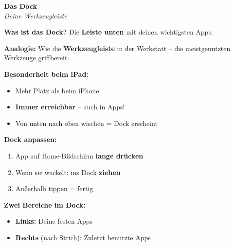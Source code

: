 \documentclass[a4paper,landscape,8pt]{extarticle}
\begin{document}
\hfill%
\begin{minipage}[t]{0.32\linewidth}
\begin{center}
\colorbox{splitblue!10}{%
\begin{minipage}{0.95\linewidth}
\vspace{2mm}
\begin{center}
{\Large\bfseries\textcolor{splitblue}{Das Dock}}\\[1pt]
{\footnotesize\itshape Deine Werkzeugleiste}
\end{center}
\vspace{2mm}
\end{minipage}%
}
\end{center}

\vspace{1mm}

\textbf{Was ist das Dock?} Die \textbf{Leiste unten} mit deinen wichtigsten Apps.

\textbf{Analogie:} Wie die \textbf{Werkzeugleiste} in der Werkstatt -- die meistgenutzten Werkzeuge griffbereit.

\textbf{Besonderheit beim iPad:}
\begin{itemize}
\item Mehr Platz als beim iPhone
\item \textbf{Immer erreichbar} -- auch in Apps!
\item Von unten nach oben wischen = Dock erscheint
\end{itemize}

\textbf{Dock anpassen:}
\begin{enumerate}
\item App auf Home-Bildschirm \textbf{lange drücken}
\item Wenn sie wackelt: ins Dock \textbf{ziehen}
\item Außerhalb tippen = fertig
\end{enumerate}

\textbf{Zwei Bereiche im Dock:}
\begin{itemize}
\item \textbf{Links:} Deine festen Apps
\item \textbf{Rechts} (nach Strich): Zuletzt benutzte Apps
\end{itemize}

\end{minipage}%
\hfill%
\end{document}

